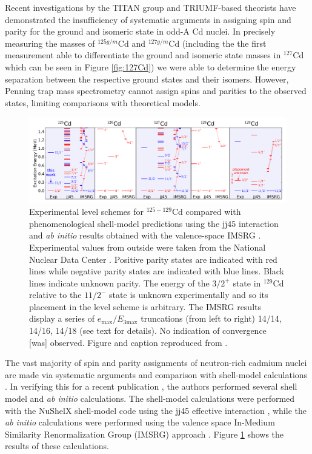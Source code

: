 \documentclass[12pt]{article}
\begin{document}
Recent investigations by the TITAN group and TRIUMF-based theorists \cite{Lascar2017} have demonstrated the insufficiency of systematic arguments in assigning spin and parity for the ground and isomeric state in odd-A Cd nuclei. In precisely measuring the masses of $^{125g/m}$Cd and $^{127g/m}$Cd (including the the first measurement able to differentiate the ground and isomeric state masses in $^{127}$Cd which can be seen in Figure \ref{fig:127Cd}) we were able to determine the energy separation between the respective ground states and their isomers. However, Penning trap mass spectrometry cannot assign spins and parities to the observed states, limiting comparisons with theoretical models.

\begin{figure}[ht]
    \begin{center}
        \includegraphics[width=\textwidth]{Cd_spectra_v2.pdf}
        \caption{Experimental level schemes for $^{125-129}$Cd compared with phenomenological shell-model predictions using the jj45 interaction \cite{Dillmann2003} and {\it ab initio} results obtained with the valence-space IMSRG \cite{Tsukiyama2012,Bogner2014,Stroberg2016,Stroberg2017}. Experimental values from outside \cite{Lascar2017} were taken from the National Nuclear Data Center \cite{NNDC2016}. Positive parity states are indicated with red lines while negative parity states are indicated with blue lines. Black lines indicate unknown parity. The energy of the $3/2^+$ state in $^{129}$Cd relative to the $11/2^-$ state is unknown experimentally and so its placement in the level scheme is arbitrary. The IMSRG results display a series of $e_{\mathrm{max}}/E_{3\mathrm{max}}$ truncations (from left to right) 14/14, 14/16, 14/18 (see text for details). No indication of convergence [was] observed. Figure and caption reproduced from \cite{Lascar2017}.}
        \label{fig:level}
    \end{center}
\end{figure}

The vast majority of spin and parity assignments of neutron-rich cadmium nuclei are made via systematic arguments and comparison with shell-model calculations \cite{ENSDF}. In verifying this for a recent publication \cite{Lascar2017}, the authors performed several shell model and \emph{ab initio} calculations. The shell-model calculations were performed with the NuShelX shell-model code \cite{Brown2003} using the jj45 effective interaction \cite{Dillmann2003}, while the \emph{ab initio} calculations were performed using the valence space In-Medium Similarity Renormalization Group (IMSRG) approach \cite{Tsukiyama2012,Bogner2014,Stroberg2016,Stroberg2017}. Figure \ref{fig:level} shows the results of these calculations.
\end{document}
